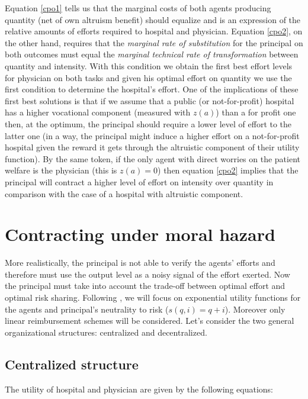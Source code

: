 \documentclass[12pt,letterpaper]{article}
\begin{document}
Equation \ref{cpo1} tells us that the marginal costs of both agents producing quantity (net of own altruism benefit) should equalize and is an expression of the relative amounts of efforts required to hospital and physician. Equation \ref{cpo2}, on the other hand, requires that the \emph{marginal rate of substitution }for the principal on both outcomes must equal the \emph{marginal technical rate of transformation } between quantity and intensity. With this condition we obtain the first best effort levels for physician on both tasks and given his optimal effort on quantity we use the  first condition to determine the hospital's effort. One of the implications of these first best solutions is that if we assume that a public (or not-for-profit) hospital has a higher vocational component (measured with  $z(a)$) than a for profit one then, at the optimum, the principal should require a lower level of effort to the latter one (in a way, the principal might induce a higher effort on a not-for-profit hospital given the reward it gets through the altruistic component of their utility function). By the same token, if the only agent with direct worries on the patient welfare is the physician (this is $z(a)=0$) then equation \ref{cpo2} implies that the principal will contract a higher level of effort on intensity over quantity in comparison with the case of a hospital with altruistic component.

\section{Contracting under moral hazard}

More realistically, the principal is not able to verify the agents' efforts and therefore must use the output level as a noisy signal of the effort exerted. Now the principal must take into account the trade-off between optimal effort and optimal risk sharing. Following \cite{HolmstromMilgrom91},  we will focus on exponential utility functions for the agents and principal's neutrality to risk ($s(q,i)=q+i$). Moreover only linear reimbursement schemes will be considered. Let's consider the two general organizational structures: centralized and decentralized.


\subsection{Centralized structure}
The utility of hospital and physician are given by the following equations:
\end{document}
